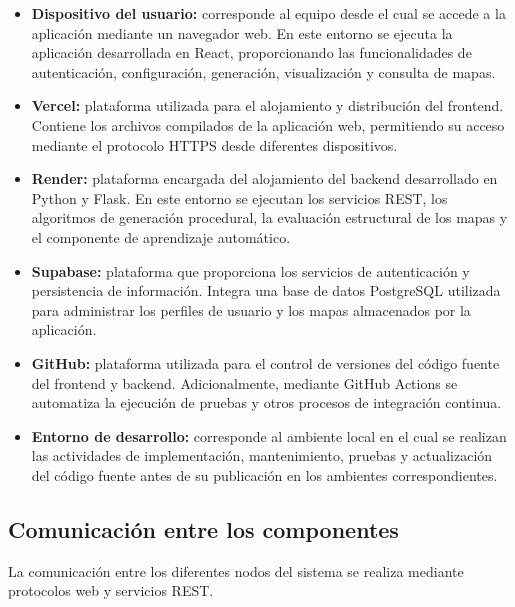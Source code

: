 \begin{itemize}
	
	\item \textbf{Dispositivo del usuario:}
	corresponde al equipo desde el cual se accede a la aplicación mediante un navegador web. En este entorno se ejecuta la aplicación desarrollada en React, proporcionando las funcionalidades de autenticación, configuración, generación, visualización y consulta de mapas.
	
	\item \textbf{Vercel:}
	plataforma utilizada para el alojamiento y distribución del frontend. Contiene los archivos compilados de la aplicación web,  permitiendo su acceso mediante el protocolo HTTPS desde diferentes dispositivos.
	
	\item \textbf{Render:}
	plataforma encargada del alojamiento del backend desarrollado en Python y Flask. En este entorno se ejecutan los servicios REST, los algoritmos de generación procedural, la evaluación estructural de los mapas y el componente de aprendizaje automático.
	
	\item \textbf{Supabase:}
	plataforma que proporciona los servicios de autenticación y persistencia de información. Integra una base de datos PostgreSQL utilizada
	para administrar los perfiles de usuario y los mapas almacenados por la aplicación.
	
	\item \textbf{GitHub:}
	plataforma utilizada para el control de versiones del código fuente del frontend y backend. Adicionalmente, mediante GitHub Actions se automatiza la ejecución de pruebas y otros procesos de integración continua.
	
	\item \textbf{Entorno de desarrollo:}
	corresponde al ambiente local en el cual se realizan las actividades de implementación, mantenimiento, pruebas y actualización del
	código fuente antes de su publicación en los ambientes correspondientes.
	
\end{itemize}

\subsection{Comunicación entre los componentes}

La comunicación entre los diferentes nodos del sistema se realiza mediante protocolos web y servicios REST.

